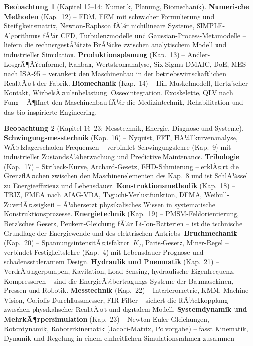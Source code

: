 ﻿\documentclass[a4paper,12pt]{report}
\theoremstyle{definition}
\newtheorem{beobachtung}{Beobachtung}
\begin{document}
\begin{beobachtung}[Kapitel 12--14: Numerik, Planung, Biomechanik]
\textbf{Numerische Methoden} (Kap.~12) -- FDM, FEM mit schwacher Formulierung
und Steifigkeitsmatrix, Newton-Raphson fÃ¼r nichtlineare Systeme,
SIMPLE-Algorithmus fÃ¼r CFD, Turbulenzmodelle und Gaussian-Process-Metamodelle --
liefern die rechnergestÃ¼tzte BrÃ¼cke zwischen analytischem Modell und
industrieller Simulation.
\textbf{Produktionsplanung} (Kap.~13) -- Andler-LosgrÃ¶ÃŸenformel, Kanban,
Wertstromanalyse, Six-Sigma-DMAIC, DoE, MES nach ISA-95 -- verankert
den Maschinenbau in der betriebswirtschaftlichen RealitÃ¤t der Fabrik.
\textbf{Biomechanik} (Kap.~14) -- Hill-Muskelmodell, Hertz'scher Kontakt,
WirbelsÃ¤ulenbelastung, Osseointegration, Exoskelette, QLV nach Fung --
Ã¶ffnet den Maschinenbau fÃ¼r die Medizintechnik, Rehabilitation und
das bio-inspirierte Engineering.
\end{beobachtung}

\begin{beobachtung}[Kapitel 16--23: Messtechnik, Energie, Diagnose und Systeme]
\textbf{Schwingungsmesstechnik} (Kap.~16) -- Nyquist, FFT, HÃ¼llkurvenanalyse,
WÃ¤lzlagerschaden-Frequenzen -- verbindet Schwingungslehre (Kap.~9)
mit industrieller ZustandsÃ¼berwachung und Predictive Maintenance.
\textbf{Tribologie} (Kap.~17) -- Stribeck-Kurve, Archard-Gesetz, EHD-Schmierung --
erklÃ¤rt die GrenzflÃ¤chen zwischen den Maschinenelementen des Kap.~8
und ist SchlÃ¼ssel zu Energieeffizienz und Lebensdauer.
\textbf{Konstruktionsmethodik} (Kap.~18) -- TRIZ, FMEA nach AIAG-VDA,
Taguchi-Verlustfunktion, DFMA, Weibull-ZuverlÃ¤ssigkeit -- Ã¼bersetzt
physikalisches Wissen in systematische Konstruktionsprozesse.
\textbf{Energietechnik} (Kap.~19) -- PMSM-Feldorientierung, Betz'sches Gesetz,
Peukert-Gleichung fÃ¼r Li-Ion-Batterien -- ist die technische Grundlage
der Energiewende und des elektrischen Antriebs.
\textbf{Bruchmechanik} (Kap.~20) -- SpannungsintensitÃ¤tsfaktor~$K_I$,
Paris-Gesetz, Miner-Regel -- verbindet Festigkeitslehre (Kap.~4)
mit Lebensdauer-Prognose und schadensstolerantem Design.
\textbf{Hydraulik und Pneumatik} (Kap.~21) -- VerdrÃ¤ngerpumpen, Kavitation,
Load-Sensing, hydraulische Eigenfrequenz, Kompressoren -- sind die
EnergieÃ¼bertragungs-Systeme der Baumaschinen, Pressen und Robotik.
\textbf{Messtechnik} (Kap.~22) -- Interferometrie, KMM, Machine Vision,
Coriolis-Durchflussmesser, FIR-Filter -- sichert die RÃ¼ckkopplung
zwischen physikalischer RealitÃ¤t und digitalem Modell.
\textbf{Systemdynamik und MehrkÃ¶rpersimulation} (Kap.~23) -- Newton-Euler-Gleichungen,
Rotordynamik, Roboterkinematik (Jacobi-Matrix, Polvorgabe) -- fasst
Kinematik, Dynamik und Regelung in einem einheitlichen Simulationsrahmen zusammen.
\end{beobachtung}
\end{document}
